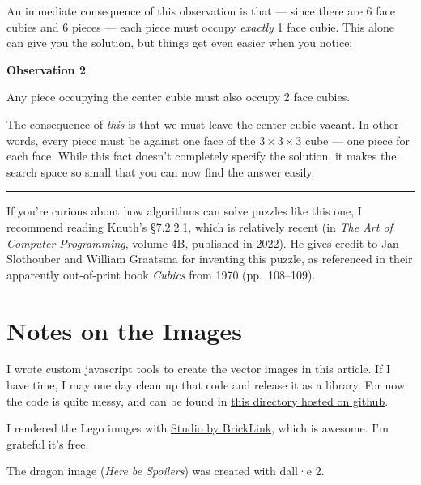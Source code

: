\documentclass[
]{article}
\newenvironment{myboxed}{\begin{lrbox}{\mybox}\begin{minipage}{0.98\textwidth}}{\end{minipage}\end{lrbox}\fbox{\usebox{\mybox}}}
\newcommand{\boxedstart}{\begin{myboxed}}
\newcommand{\boxedend}{\end{myboxed}}
\begin{document}
An immediate consequence of this observation is that --- since there are
6 face cubies and 6 pieces --- each piece must occupy \emph{exactly} 1
face cubie. This alone can give you the solution, but things get even
easier when you notice:

\boxedstart

\textbf{Observation 2} \(\quad\)

Any piece occupying the center cubie must also occupy 2 face cubies.

\boxedend 

The consequence of \emph{this} is that we must leave the center cubie
vacant. In other words, every piece must be against one face of the
\(3\times 3\times 3\) cube --- one piece for each face. While this fact
doesn't completely specify the solution, it makes the search space so
small that you can now find the answer easily.

\begin{center}\rule{0.5\linewidth}{0.5pt}\end{center}

If you're curious about how algorithms can solve puzzles like this one,
I recommend reading Knuth's §7.2.2.1, which is relatively recent (in
\emph{The Art of Computer Programming}, volume 4B, published in 2022).
He gives credit to Jan Slothouber and William Graatsma for inventing
this puzzle, as referenced in their apparently out-of-print book
\emph{Cubics} from 1970 (pp.~108--109).

\hypertarget{notes-on-the-images}{%
\section{Notes on the Images}\label{notes-on-the-images}}

I wrote custom javascript tools to create the vector images in this
article. If I have time, I may one day clean up that code and release it
as a library. For now the code is quite messy, and can be found in
\href{https://github.com/tylerneylon/math/tree/master/lego_puzzle/img_src}{this
directory hosted on github}.

I rendered the Lego images with
\href{https://www.bricklink.com/v3/studio/download.page}{Studio by
BrickLink}, which is awesome. I'm grateful it's free.

The dragon image (\emph{Here be Spoilers}) was created with dall\!·\!e 2.
\end{document}
